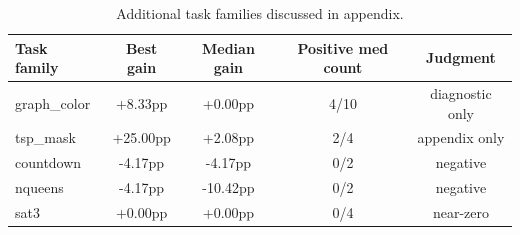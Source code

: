 \begin{table}[t]
\centering
\small
\caption{Additional task families discussed in appendix.}
\label{tab:appendix-negative-tasks}
\begin{tabular}{lcccc}
\toprule
Task family & Best gain & Median gain & Positive med count & Judgment \\
\midrule
graph\_color & +8.33pp & +0.00pp & 4/10 & diagnostic only \\
tsp\_mask & +25.00pp & +2.08pp & 2/4 & appendix only \\
countdown & -4.17pp & -4.17pp & 0/2 & negative \\
nqueens & -4.17pp & -10.42pp & 0/2 & negative \\
sat3 & +0.00pp & +0.00pp & 0/4 & near-zero \\
\bottomrule
\end{tabular}
\end{table}
